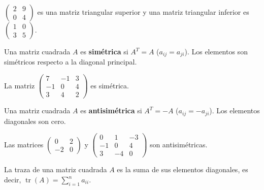 \begin{example} $\begin{pmatrix} 2 & 9 \\ 0 & 4 \end{pmatrix}$ es una matriz triangular superior y una matriz triangular inferior es $\begin{pmatrix} 1 & 0 \\ 3 & 5 \end{pmatrix}.$
\end{example}

\begin{definition} Una matriz cuadrada $A$ es \textbf{simétrica} si $A^T = A$ ($a_{ij} = a_{ji}$). Los elementos son simétricos respecto a la diagonal principal.
\end{definition}

\begin{example} La matriz
$\begin{pmatrix}
7 & -1 & 3 \\
-1 & 0 & 4 \\
3 & 4 & 2
\end{pmatrix}$ es simétrica.
\end{example}

\begin{definition} Una matriz cuadrada $A$ es \textbf{antisimétrica} si $A^T = -A$ ($a_{ij} = -a_{ji}$). Los elementos diagonales son cero.
\end{definition}

\begin{example} Las matrices
$\begin{pmatrix}
0 & 2 \\
-2 & 0
\end{pmatrix}$ y $\begin{pmatrix}
0 & 1 & -3 \\
-1 & 0 & 4 \\
3 & -4 & 0
\end{pmatrix}$ son antisimétricas.
\end{example}

\begin{definition} \label{def:traza}
La traza de una matriz cuadrada $A$ es la suma de sus elementos diagonales, es decir, \( \operatorname{tr}(A) = \sum_{i=1}^n a_{ii} .\)
\end{definition}

